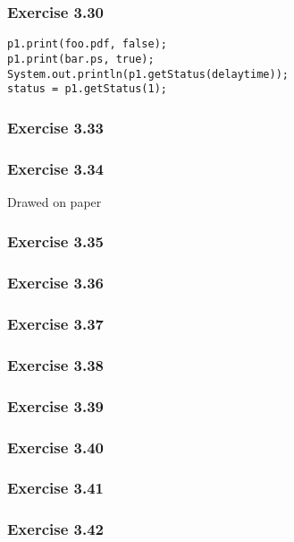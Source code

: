 \subsubsection*{Exercise 3.30}
\begin{lstlisting}
p1.print(foo.pdf, false);
p1.print(bar.ps, true);
System.out.println(p1.getStatus(delaytime));
status = p1.getStatus(1);
\end{lstlisting}

\subsubsection*{Exercise 3.33}


\subsubsection*{Exercise 3.34}
Drawed on paper

\subsubsection*{Exercise 3.35}


\subsubsection*{Exercise 3.36}


\subsubsection*{Exercise 3.37}


\subsubsection*{Exercise 3.38}


\subsubsection*{Exercise 3.39}


\subsubsection*{Exercise 3.40}


\subsubsection*{Exercise 3.41}


\subsubsection*{Exercise 3.42}


